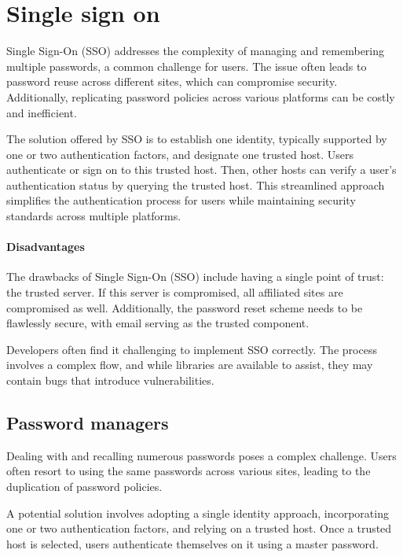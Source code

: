 \section{Single sign on}

Single Sign-On (SSO) addresses the complexity of managing and remembering multiple passwords, a common challenge for users. 
The issue often leads to password reuse across different sites, which can compromise security. 
Additionally, replicating password policies across various platforms can be costly and inefficient.

The solution offered by SSO is to establish one identity, typically supported by one or two authentication factors, and designate one trusted host. 
Users authenticate or sign on to this trusted host. 
Then, other hosts can verify a user's authentication status by querying the trusted host. 
This streamlined approach simplifies the authentication process for users while maintaining security standards across multiple platforms.

\paragraph*{Disadvantages}
The drawbacks of Single Sign-On (SSO) include having a single point of trust: the trusted server. 
If this server is compromised, all affiliated sites are compromised as well. 
Additionally, the password reset scheme needs to be flawlessly secure, with email serving as the trusted component.

Developers often find it challenging to implement SSO correctly. 
The process involves a complex flow, and while libraries are available to assist, they may contain bugs that introduce vulnerabilities.

\subsection{Password managers}
Dealing with and recalling numerous passwords poses a complex challenge. 
Users often resort to using the same passwords across various sites, leading to the duplication of password policies.

A potential solution involves adopting a single identity approach, incorporating one or two authentication factors, and relying on a trusted host. 
Once a trusted host is selected, users authenticate themselves on it using a master password.